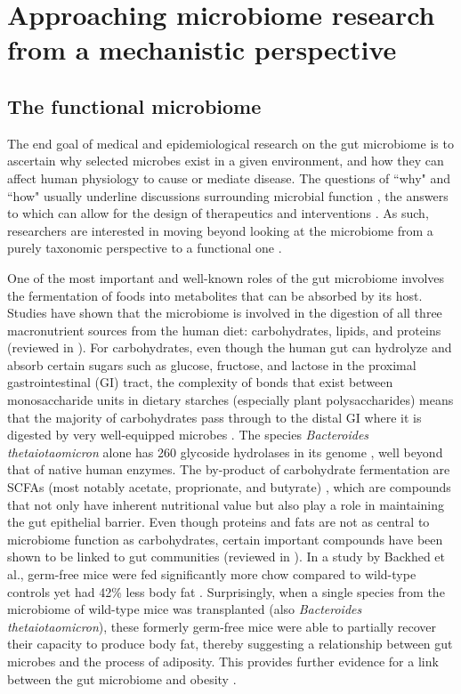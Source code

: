 \section{Approaching microbiome research from a mechanistic perspective}

\subsection{The functional microbiome}

The end goal of medical and epidemiological research on the gut microbiome is to ascertain why selected microbes exist in a given environment, and how they can affect human physiology to cause or mediate disease. The questions of ``why" and ``how" usually underline discussions surrounding microbial function \cite{klassen2018defining}, the answers to which can allow for the design of therapeutics and interventions \cite{durack2019gut}. As such, researchers are interested in moving beyond looking at the microbiome from a purely taxonomic perspective to a functional one \cite{heintz-buschart2018human}.  

One of the most important and well-known roles of the gut microbiome involves the fermentation of foods into metabolites that can be absorbed by its host. Studies have shown that the microbiome is involved in the digestion of all three macronutrient sources from the human diet: carbohydrates, lipids, and proteins (reviewed in \cite{oliphant2019macronutrient}). For carbohydrates, even though the human gut can hydrolyze and absorb certain sugars such as glucose, fructose, and lactose in the proximal gastrointestinal (GI) tract, the complexity of bonds that exist between monosaccharide units in dietary starches (especially plant polysaccharides) means that the majority of carbohydrates pass through to the distal GI where it is digested by very well-equipped microbes \cite{wong2006colonic}. The species \emph{Bacteroides thetaiotaomicron} alone has 260 glycoside hydrolases in its genome \cite{xu2003genomic}, well beyond that of native human enzymes. The by-product of carbohydrate fermentation are SCFAs (most notably acetate, proprionate, and butyrate) \cite{macfarlane2012bacteria}, which are compounds that not only have inherent nutritional value but also play a role in maintaining the gut epithelial barrier. Even though proteins and fats are not as central to microbiome function as carbohydrates, certain important compounds have been shown to be linked to gut communities (reviewed in \cite{morowitz2011contributions}). In a study by Backhed et al., germ-free mice were fed significantly more chow compared to wild-type controls yet had 42\% less body fat \cite{backhed2004gut}. Surprisingly, when a single species from the microbiome of wild-type mice was transplanted (also \emph{Bacteroides thetaiotaomicron}), these formerly germ-free mice were able to partially recover their capacity to produce body fat, thereby suggesting a relationship between gut microbes and the process of adiposity. This provides further evidence for a link between the gut microbiome and obesity \cite{turnbaugh2009core}. 

